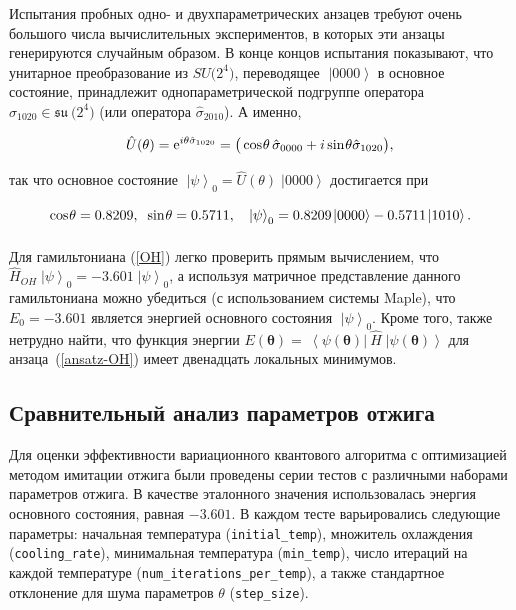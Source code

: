 \documentclass[a4paper]{report}
\newcommand{\ket}[1] {\!\!\;\ensuremath{\left|#1\right\rangle}}
\newcommand{\bra}[1] {\!\!\:\ensuremath{\left\langle#1\right|\!\!\:}}
\begin{document}
Испытания пробных одно- и двухпараметрических анзацев требуют очень большого числа вычислительных экспериментов, в которых эти анзацы генерируются случайным образом. В конце концов испытания показывают, что унитарное преобразование из $SU\!\big(2^4\big)$, переводящее $\ket{0000}$ в основное состояние, принадлежит однопараметрической подгруппе оператора ${\hat{\sigma}_{1020}\!\in\! \mathfrak{su}\:\!\!\big(2^4\big)}$ (или оператора ${\hat{\sigma}_{2010}}$). А именно,
\begin{equation*}
  \hat{U}(\theta)= \mathrm{e}^{i\theta\hat{\sigma}_{1020}}= \big(\cos\:\!\!\theta\,\hat{\sigma}_{0000}+ i\sin\:\!\!\theta\hat{\sigma}_{1020}\big),
  \vphantom{\int}
\end{equation*}
так что основное состояние ${\ket{\psi}_0= \hat{U}(\theta)\ket{0000}}$ достигается при
\begin{equation*}
\cos\:\!\!\theta= 0.8209,\;\; \sin\:\!\!\theta= 0.5711,\quad  \ket{\psi}_0= 0.8209\ket{0000}- 0.5711\ket{1010}.
\vphantom{\int}
\end{equation*}

Для гамильтониана (\ref{OH}) легко проверить прямым вычислением, что ${\hat{H}_{\scriptscriptstyle OH}\ket{\psi}_0= -3.601\ket{\psi}_0}$, а используя матричное представление данного гамильтониана можно убедиться (с использованием системы Maple), что ${E_{0}=-3.601}$ является энергией основного состояния ${\ket{\psi}_0}$. Кроме того, также нетрудно найти, что функция энергии $E(\bm\theta)= \bra{\psi(\bm\theta)}\hat{H} \ket{\psi(\bm\theta)}$ для анзаца~(\ref{ansatz-OH}) имеет двенадцать локальных минимумов.


\subsection{Сравнительный анализ параметров отжига}

Для оценки эффективности вариационного квантового алгоритма с оптимизацией методом имитации отжига были проведены серии тестов с различными наборами параметров отжига. В качестве эталонного значения использовалась энергия основного состояния, равная $-3.601$. В каждом тесте варьировались следующие параметры: начальная температура (\texttt{initial\_temp}), множитель охлаждения (\texttt{cooling\_rate}), минимальная температура (\texttt{min\_temp}), число итераций на каждой температуре (\texttt{num\_iterations\_per\_temp}), а также стандартное отклонение для шума параметров $\theta$ (\texttt{step\_size}).
\end{document}
